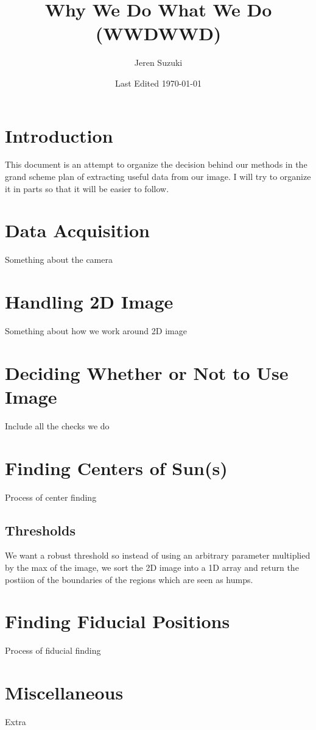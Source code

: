 \documentclass[10pt]{article}
\title{Why We Do What We Do (WWDWWD)}
\author{Jeren Suzuki}
\date{Last Edited \today}
\begin{document}
\maketitle
{}
\tableofcontents
{}
\clearpage
{}

\section*{Introduction} %
\label{sec:introduction}
    This document is an attempt to organize the decision behind our methods in the grand scheme plan of extracting useful data from our image. I will try to organize it in parts so that it will be easier to follow.

\section{Data Acquisition} %
\label{sec:data_acquisition}
Something about the camera

\section{Handling 2D Image} %
\label{sec:handling_2d_image}
Something about how we work around 2D image

\section{Deciding Whether or Not to Use Image} %
\label{sec:deciding_whether_or_not_to_use_image}
Include all the checks we do

\section{Finding Centers of Sun(s)} %
\label{sec:finding_centers_of_sun}
Process of center finding
\subsection{Thresholds} %
\label{sub:thresholds}
We want a robust threshold so instead of using an arbitrary parameter multiplied by the max of the image, we sort the 2D image into a 1D array and return the postiion of the boundaries of the regions which are seen as humps.

\section{Finding Fiducial Positions} %
\label{sec:finding_fiducial_positions}
Process of fiducial finding

\section{Miscellaneous} %
\label{sec:miscellaneous}
Extra
\end{document}

